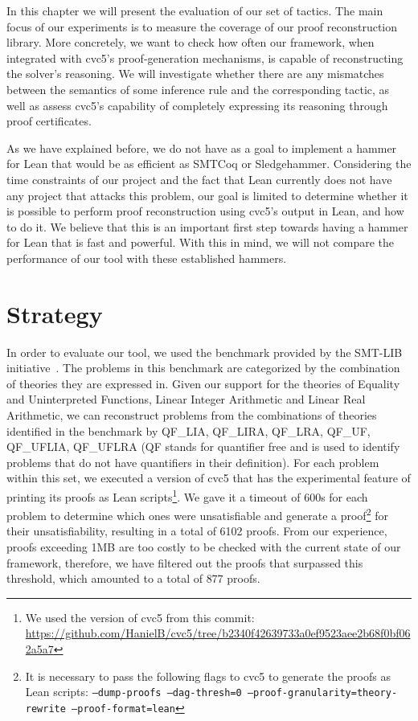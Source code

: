In this chapter we will present the evaluation of our set of tactics.
%
The main focus of our experiments is to measure the coverage
of our proof reconstruction library.
%
More concretely, we want to check how often our framework, when
integrated with cvc5's proof-generation mechanisms, is capable
of reconstructing the solver's reasoning.
%
We will investigate whether there are any mismatches between
the semantics of some inference rule and the corresponding tactic,
as well as assess cvc5's capability of completely expressing
its reasoning through proof certificates.

As we have explained before, we do not have as a goal to implement a hammer
for Lean that would be as efficient as SMTCoq or Sledgehammer.
%
Considering the time constraints of our project and the fact that
Lean currently does not have any project that attacks this problem, our goal
is limited to determine whether it is possible to perform proof reconstruction
using cvc5's output in Lean, and how to do it.
%
We believe that this is an important first step towards having
a hammer for Lean that is fast and powerful.
%
With this in mind, we will not compare the performance of our tool
with these established hammers.

\section{Strategy}

In order to evaluate our tool, we used the benchmark provided
by the SMT-LIB initiative~\cite{smtlib_initiative}. The problems in this benchmark
are categorized by the combination of theories they are expressed in.
Given our support for the theories of Equality and Uninterpreted Functions,
Linear Integer Arithmetic and Linear Real Arithmetic, we can reconstruct problems
from the combinations of theories identified in the benchmark by QF\_LIA, QF\_LIRA,
QF\_LRA, QF\_UF, QF\_UFLIA, QF\_UFLRA (QF stands for quantifier free and is used
to identify problems that do not have quantifiers in their definition).
%
For each problem within this set, we executed a version of cvc5 that has the experimental feature of printing its proofs as Lean scripts\footnote{We used the version of
  cvc5 from this commit: \url{https://github.com/HanielB/cvc5/tree/b2340f42639733a0ef9523aee2b68f0bf062a5a7}}.
We gave it a timeout of 600s for each problem to determine
which ones were unsatisfiable and generate a proof\footnote{It is necessary to pass the following
  flags to cvc5 to generate the proofs as Lean scripts: \texttt{--dump-proofs --dag-thresh=0
    --proof-granularity=theory-rewrite --proof-format=lean}} for their unsatisfiability,
resulting in a total of 6102 proofs.
%
From our experience, proofs exceeding 1MB are too costly to be checked
with the current state of our framework, therefore, we have filtered out the proofs
that surpassed this threshold, which amounted to a total of 877 proofs.


